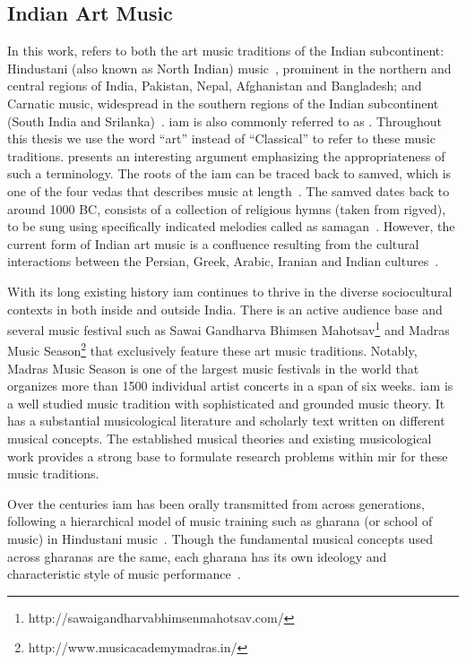 \subsection{Indian Art Music}
\label{sec:music_background_iam}

In this work,  refers to both the art music traditions of the Indian subcontinent: Hindustani (also known as North Indian) music~\cite{Bor2010, Danielou2010}, prominent in the northern and central regions of India, Pakistan, Nepal, Afghanistan and Bangladesh; and Carnatic music, widespread in the southern regions of the Indian subcontinent (South India and Srilanka)~\cite{Singh1995,Viswanathan2004}. \gls{iam} is also commonly referred to as . Throughout this thesis we use the word ``art'' instead of ``Classical'' to refer to these music traditions. \cite[Page 1]{Raja2012} presents an interesting argument emphasizing the appropriateness of such a terminology. The roots of the \gls{iam} can be traced back to \gls{samved}, which is one of the four \gls{vedas} that describes music at length~\cite{Trivedi2008,Singh1995}. The \gls{samved} dates back to around 1000 BC, consists of a collection of religious hymns (taken from \gls{rigved}), to be sung using specifically indicated melodies called as \gls{samagan}~\cite{Griffith2004}. However, the current form of Indian art music is a confluence resulting from the cultural interactions between the Persian, Greek, Arabic, Iranian and Indian cultures~\cite{Kaul2007,Saraf2011,Singh1995}.

With its long existing history \gls{iam} continues to thrive in the diverse sociocultural contexts in both inside and outside India. There is an active audience base and several music festival such as Sawai Gandharva Bhimsen Mahotsav\footnote{http://sawaigandharvabhimsenmahotsav.com/} and Madras Music Season\footnote{http://www.musicacademymadras.in/} that exclusively feature these art music traditions. Notably, Madras Music Season is one of the largest music festivals in the world that organizes more than 1500 individual artist concerts in a span of six weeks. \Gls{iam} is a well studied music tradition with sophisticated and grounded music theory. It has a substantial musicological literature and scholarly text written on different musical concepts. The established musical theories and existing musicological work provides a strong base to formulate research problems within \gls{mir} for these music traditions. 

Over the centuries \gls{iam} has been orally transmitted from across generations, following a hierarchical model of music training such as \gls{gharana} (or school of music) in Hindustani music~\cite{Saraf2011,Mehta2008}. Though the fundamental musical concepts used across \glspl{gharana} are the same, each \gls{gharana} has its own ideology and characteristic style of music performance~\cite{Deshpande1989}.

